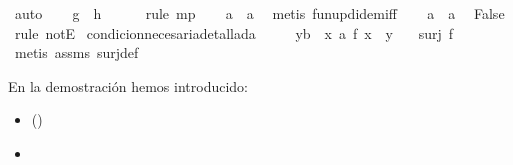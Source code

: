 \begin{isabellebody}
\ auto\isanewline
\ \ \isamarkupfalse%
\ {\isachardoublequoteopen}{\isacharparenleft}{\isacharquery}g\ {\isacharequal}\ {\isacharquery}h{\isacharparenright}{\isachardoublequoteclose}\ \isamarkupfalse%
\ {}\ {}\ \isamarkupfalse%
\ {\isacharparenleft}rule\ mp{\isacharparenright}\isanewline
\ \ \isamarkupfalse%
\ {\isachardoublequoteopen}a{}\ {\isacharequal}\ a{}{\isachardoublequoteclose}\ \isamarkupfalse%
\ {\isacharparenleft}metis\ fun{\isacharunderscore}upd{\isacharunderscore}idem{\isacharunderscore}iff{\isacharparenright}\isanewline
\ \ \isamarkupfalse%
\ {\isacharbackquoteopen}a{}\ {\isasymnoteq}\ a{}{\isacharbackquoteclose}\ \isamarkupfalse%
\ False\ \isamarkupfalse%
\ {\isacharparenleft}rule\ notE{\isacharparenright}\isanewline
{}\isamarkupfalse%
%
\endisatagproof
{\isafoldproof}%
%
\isadelimproof
\isanewline
%
\endisadelimproof
\isanewline
{}\isamarkupfalse%
\ condicion{\isacharunderscore}necesaria{\isacharunderscore}detallada{\isacharunderscore}{}{\isacharcolon}\isanewline
\ \ \ {\isachardoublequoteopen}\ {\isasymforall}\ {\isacharparenleft}y{\isacharcolon}{\isacharcolon}{\isacharprime}b{\isacharparenright}{\isachardot}\ {\isacharparenleft}{\isasymexists}\ {\isacharparenleft}x{\isacharcolon}{\isacharcolon}\ {\isacharprime}a{\isacharparenright}{\isachardot}\ f\ x\ {\isacharequal}\ y{\isacharparenright}{\isachardoublequoteclose}\isanewline
\ \ \ {\isachardoublequoteopen}surj\ f{\isachardoublequoteclose}\isanewline
%
\isadelimproof
\ \ %
\endisadelimproof
%
\isatagproof
{}\isamarkupfalse%
\ {\isacharparenleft}metis\ assms\ surj{\isacharunderscore}def{\isacharparenright}%
\endisatagproof
{\isafoldproof}%
%
\isadelimproof
%
\endisadelimproof
%
\begin{isamarkuptext}%
En la demostración hemos introducido: 
 \begin{itemize}
    \item[]  
      \hfill () 
  \end{itemize} 
 \begin{itemize}
    \item[]  

\end{itemize}
\end{isamarkuptext}
\end{isabellebody}
